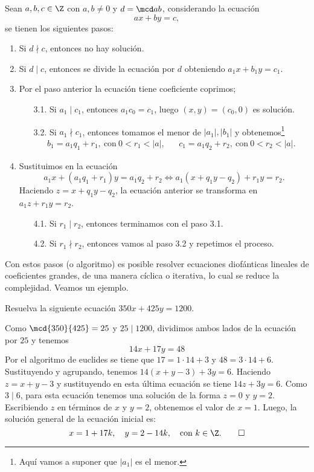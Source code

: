 Sean $a,b, c \in \Z$ con $a,b \neq 0$ y $d = \mcd a b$, considerando la ecuación
\[
    ax + by = c,
\]
se tienen los siguientes pasos:
\begin{enumerate}
    \item Si $d\nmid c$, entonces no hay solución.
    \item Si $d \mid c$, entonces se divide la ecuación por $d$ obteniendo $a_1 x + b_1 y = c_1$.
    \item Por el paso anterior la ecuación tiene coeficiente coprimos;
    \begin{enumerate}
        \item[3.1.] Si $a_1 \mid c_1$, entonces $a_1 c_0 = c_1$, luego $(x,y) = (c_0, 0)$ es solución.
        \item[3.2.] Si $a_1 \nmid c_1$, entonces tomamos el menor de $|a_1|, |b_1|$ y obtenemos\footnote{Aquí vamos a suponer que $|a_1|$ es el menor.}
        \begin{align*}
            b_1 = a_1 q_1 + r_1,\ \text{con}\ 0<r_1<|a|, && c_1 = a_1 q_2 + r_2,\ \text{con}\ 0 < r_2 < |a|.
        \end{align*}
    \end{enumerate}
    \item Sustituimos en la ecuación
    \[
        a_1 x + (a_1 q_1 + r_1) y = a_1 q_2 + r_2 \iff a_1 (x + q_1 y - q_2) + r_1 y = r_2.
    \]
    Haciendo $z = x + q_1 y - q_2$, la ecuación anterior se transforma en $a_1 z + r_1 y = r_2$.
    \begin{enumerate}
        \item[4.1.] Si $r_1 \mid r_2$, entonces terminamos con el paso 3.1.
        \item[4.2.] Si $r_1 \nmid r_2$, entonces vamos al paso 3.2 y repetimos el proceso.
    \end{enumerate}
\end{enumerate}

Con estos pasos (o algoritmo) es posible resolver ecuaciones diofánticas lineales de coeficientes grandes, de una manera
cíclica o iterativa, lo cual se reduce la complejidad.
Veamos un ejemplo.

\begin{example}
    Resuelva la siguiente ecuación $350x + 425y = 1200$.
\end{example}
\begin{solution}
    Como $\mcd{350}{425} = 25$ y $25 \mid 1200$, dividimos ambos lados de la ecuación por $25$ y tenemos
    \[
        14x+17y=48
    \]
    Por el algoritmo de euclides se tiene que $17 = 1\cdot14+3$ y $48=3\cdot14+6$.
    Sustituyendo y agrupando, tenemos $14(x+y-3)+3y=6.$
    Haciendo $z=x+y-3$ y sustituyendo en esta última ecuación se tiene $14z+3y=6.$
    Como $3\mid6$, para esta ecuación tenemos una solución de la forma $z=0$ y $y=2$.
    Escribiendo $z$ en términos de $x$ y $y=2$, obtenemos el valor de $x=1$.
    Luego, la solución general de la ecuación inicial es:
    \[
        x=1+17k, \quad y=2-14k, \quad\text{con}\ k \in \Z. \qedhere
    \]
\end{solution}




